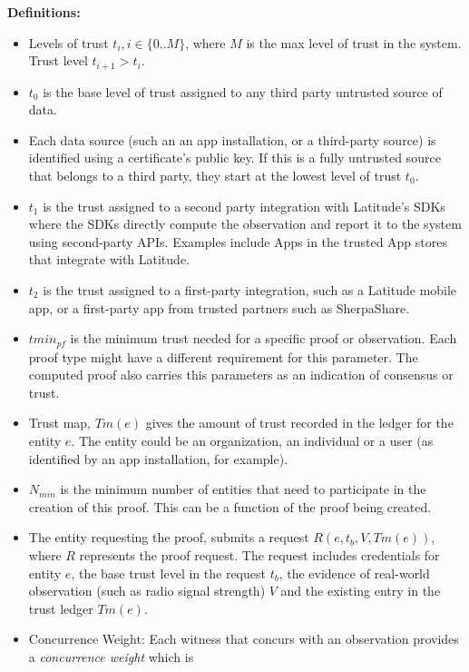 \newcommand\NF{\mathit{Nf}}
\newcommand\TM{\mathit{Tm}}
\noindent
{\bf Definitions:}
\begin{itemize}
    \item Levels of trust $t_i, i \in \{0..M\}$, where $M$ is the max level of trust in the system. Trust level $t_{i+1} >
        t_i$.
    \item $t_0$ is the base level of trust assigned to any third party untrusted source of data.

    \item Each data source (such an an app installation, or a third-party source) is identified using a certificate's
        public key. If this is a fully untrusted source that belongs to a third party, they start at the lowest level of
        trust $t_0$.

    \item $t_1$ is the trust assigned to a second party integration with Latitude's SDKs where the SDKs directly compute the
        observation and report it to the system using second-party APIs. Examples include Apps in the trusted App stores
        that integrate with Latitude.
    \item $t_2$ is the trust assigned to a first-party integration, such as a Latitude mobile app, or a first-party app
        from trusted partners such as SherpaShare.
    \item $tmin_{pf}$ is the minimum trust needed for a specific proof or observation. Each proof type might have a
        different requirement for this parameter. The computed proof also carries this parameters as an indication of
        consensus or trust.
    \item Trust map, $\TM(e)$ gives the amount of trust recorded in the ledger for the entity $e$. The entity could be an
        organization, an individual or a user (as identified by an app installation, for example).
    \item $N_{min}$ is the minimum number of entities that need to participate in the creation of this proof. This can
        be a function of the proof being created.
    \item The entity requesting the proof, submits a request $R(e, t_b, V, \TM(e))$, where $R$ represents the proof
        request. The request includes credentials for entity $e$, the base trust level in the request $t_b$, the
        evidence of real-world observation (such as radio signal strength) $V$ and the existing entry in the trust
        ledger $\TM(e)$.
    \item Concurrence Weight: Each witness that concurs with an observation provides a {\em concurrence weight} which is

\end{itemize}
